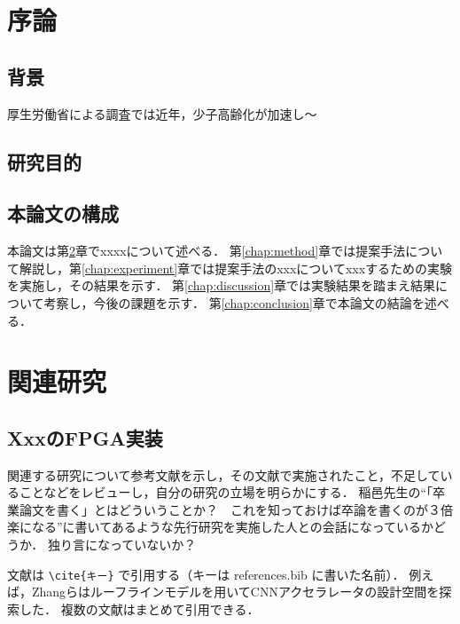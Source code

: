 \documentclass[uplatex,dvipdfmx,a4paper,11pt,openany,nomag*]{jsreport}
\begin{document}
\chapter{序論}
\label{chap:intro}

\section{背景}

厚生労働省による調査では近年，少子高齢化が加速し〜

\section{研究目的}

\section{本論文の構成}

本論文は第\ref{chap:related}章でxxxxについて述べる．
第\ref{chap:method}章では提案手法について解説し，第\ref{chap:experiment}章では提案手法のxxxについてxxxするための実験を実施し，その結果を示す．
第\ref{chap:discussion}章では実験結果を踏まえ結果について考察し，今後の課題を示す．
第\ref{chap:conclusion}章で本論文の結論を述べる．

\chapter{関連研究}
\label{chap:related}

\section{XxxのFPGA実装}

関連する研究について参考文献を示し，その文献で実施されたこと，不足していることなどをレビューし，自分の研究の立場を明らかにする．
稲邑先生の“「卒業論文を書く」とはどういうことか？　これを知っておけば卒論を書くのが３倍楽になる”に書いてあるような先行研究を実施した人との会話になっているかどうか．
独り言になっていないか？

文献は \verb|\cite{キー}| で引用する（キーは references.bib に書いた名前）．
例えば，Zhangらはルーフラインモデルを用いてCNNアクセラレータの設計空間を探索した\cite{zhang2015fpga}．
複数の文献はまとめて引用できる\cite{vaswani2017attention,matsuo2006,ieice_shiori}．
\end{document}
